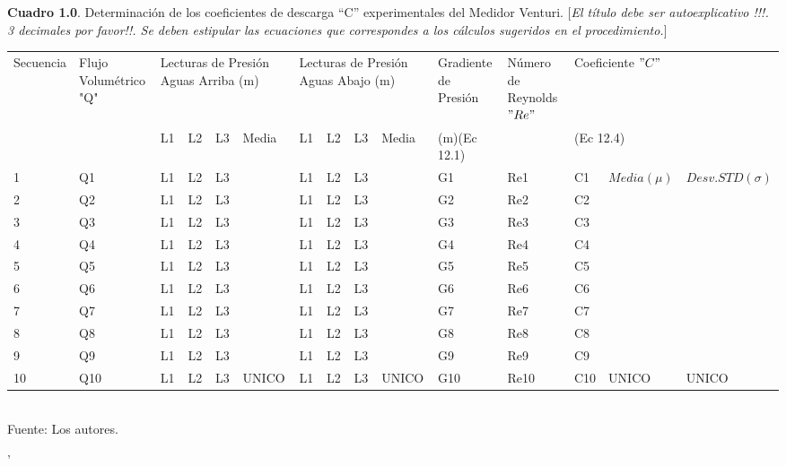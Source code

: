 \documentclass[11pt, letterpaper]{article}
\begin{document}


\begin{table}[ht]
\centering
\scriptsize
\textbf{Cuadro 1.0}. Determinación de los coeficientes de descarga “C” experimentales del Medidor Venturi.
[\emph{El título debe ser autoexplicativo !!!. 3 decimales por favor!!. Se deben estipular las ecuaciones que correspondes a los cálculos sugeridos en el procedimiento.}]
\scriptsize
\begin{tabular}{|p{1cm}p{1.3cm}|p{0.30cm}p{0.30cm}p{0.30cm}p{0.50cm}|p{0.30cm}p{0.30cm}p{0.30cm}p{0.50cm}|p{1.8cm}|p{1.5cm}|p{0.20cm}p{0.83cm}p{0.83cm}|}
  \hline
    Secuencia & Flujo Volumétrico "Q" & \multicolumn{4}{p{3cm}|}{Lecturas de Presión Aguas Arriba (m)} & \multicolumn{4}{p{3cm}|}{Lecturas de Presión Aguas Abajo (m)} & Gradiente de Presión & Número de Reynolds $"Re"$ & \multicolumn{3}{|p{3.5cm}|}{Coeficiente $"C"$}\\
    &  & L1 & L2 & L3 & Media & L1 & L2 & L3 & Media & (m)(Ec 12.1) & & \multicolumn{3}{|p{2.5cm}|}{(Ec 12.4)} \\ 
    \hline
        1 & Q1 & L1 & L2 & L3 & & L1 & L2 & L3 & & G1 & Re1 & C1 & $Media(\mu)$ & $Desv.STD(\sigma)$\\
        2 & Q2 & L1 & L2 & L3 &  & L1 & L2 & L3 && G2 & Re2 & C2 & &\\
        3 & Q3 & L1 & L2 & L3 & & L1 & L2 & L3 & & G3 & Re3 & C3 & &\\
        4 & Q4 & L1 & L2 & L3 & & L1 & L2 & L3 & & G4 & Re4 & C4 & &\\
        5 & Q5 & L1 & L2 & L3 & & L1 & L2 & L3 & & G5 & Re5 & C5 & &\\
        6 & Q6 & L1 & L2 & L3 & & L1 & L2 & L3 & & G6 & Re6 & C6 & &\\
        7 & Q7 & L1 & L2 & L3 & & L1 & L2 & L3 & & G7 & Re7 & C7 & &\\
        8 & Q8 & L1 & L2 & L3 & & L1 & L2 & L3 & & G8 & Re8 & C8 & &\\
        9 & Q9 & L1 & L2 & L3 & & L1 & L2 & L3 & & G9 & Re9 & C9 & &\\
        10 & Q10 & L1 & L2 & L3 & UNICO & L1 & L2 & L3 & UNICO & G10 & Re10 & C10 & UNICO &UNICO\\
   \hline
\end{tabular}\\
\small{Fuente: Los autores.}
\end{table}'
\end{document}
